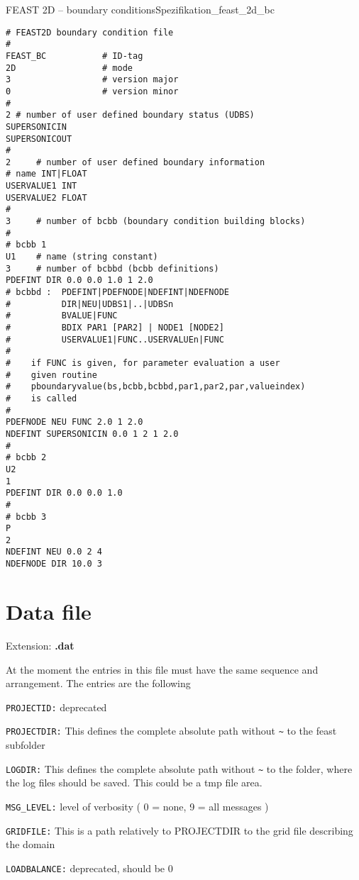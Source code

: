 \begin{code}{FEAST 2D -- boundary conditions}{Spezifikation_feast_2d_bc}
\begin{verbatim}
# FEAST2D boundary condition file
#
FEAST_BC           # ID-tag
2D                 # mode
3                  # version major
0                  # version minor
#
2 # number of user defined boundary status (UDBS)
SUPERSONICIN
SUPERSONICOUT
#
2     # number of user defined boundary information
# name INT|FLOAT
USERVALUE1 INT
USERVALUE2 FLOAT
#
3     # number of bcbb (boundary condition building blocks)
#
# bcbb 1
U1    # name (string constant)
3     # number of bcbbd (bcbb definitions)
PDEFINT DIR 0.0 0.0 1.0 1 2.0   
# bcbbd :  PDEFINT|PDEFNODE|NDEFINT|NDEFNODE 
#          DIR|NEU|UDBS1|..|UDBSn 
#          BVALUE|FUNC 
#          BDIX PAR1 [PAR2] | NODE1 [NODE2]
#          USERVALUE1|FUNC..USERVALUEn|FUNC
#
#    if FUNC is given, for parameter evaluation a user 
#    given routine 
#    pboundaryvalue(bs,bcbb,bcbbd,par1,par2,par,valueindex) 
#    is called
#
PDEFNODE NEU FUNC 2.0 1 2.0 
NDEFINT SUPERSONICIN 0.0 1 2 1 2.0
#
# bcbb 2
U2
1
PDEFINT DIR 0.0 0.0 1.0
#
# bcbb 3
P
2
NDEFINT NEU 0.0 2 4
NDEFNODE DIR 10.0 3
\end{verbatim}
\end{code}



\section{Data file}

Extension: {\bf .dat}

At the moment the entries in this file must have the same sequence and
arrangement. The entries are the following

\verb+PROJECTID:+ deprecated

\verb+PROJECTDIR:+ This defines the complete absolute path without \verb+~+
 to the feast subfolder

\verb+LOGDIR:+ This defines the complete absolute path without \verb+~+ to the folder, where
the log files should be saved. This could be a tmp file area.

\verb+MSG_LEVEL:+     level of verbosity  ( 0 = none, 9 = all messages )

\verb+GRIDFILE:+ This is a path relatively to PROJECTDIR to the grid file describing
the domain

\verb+LOADBALANCE:+ deprecated, should be 0

